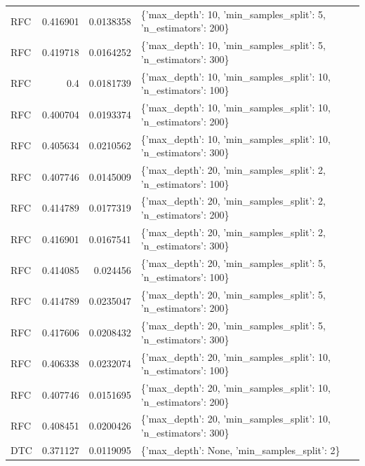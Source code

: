 \documentclass[conference,onecolumn]{IEEEtran}
\begin{document}
\begin{table}
\begin{center}
\begin{longtable}{lrrl}
             RFC          &   0.416901 &       0.0138358  & \{'max\_depth': 10, 'min\_samples\_split': 5, 'n\_estimators': 200\}    \\
             RFC          &   0.419718 &       0.0164252  & \{'max\_depth': 10, 'min\_samples\_split': 5, 'n\_estimators': 300\}    \\
             RFC          &   0.4      &       0.0181739  & \{'max\_depth': 10, 'min\_samples\_split': 10, 'n\_estimators': 100\}   \\
             RFC          &   0.400704 &       0.0193374  & \{'max\_depth': 10, 'min\_samples\_split': 10, 'n\_estimators': 200\}   \\
             RFC          &   0.405634 &       0.0210562  & \{'max\_depth': 10, 'min\_samples\_split': 10, 'n\_estimators': 300\}   \\
             RFC          &   0.407746 &       0.0145009  & \{'max\_depth': 20, 'min\_samples\_split': 2, 'n\_estimators': 100\}    \\
             RFC          &   0.414789 &       0.0177319  & \{'max\_depth': 20, 'min\_samples\_split': 2, 'n\_estimators': 200\}    \\
             RFC          &   0.416901 &       0.0167541  & \{'max\_depth': 20, 'min\_samples\_split': 2, 'n\_estimators': 300\}    \\
             RFC          &   0.414085 &       0.024456   & \{'max\_depth': 20, 'min\_samples\_split': 5, 'n\_estimators': 100\}    \\
             RFC          &   0.414789 &       0.0235047  & \{'max\_depth': 20, 'min\_samples\_split': 5, 'n\_estimators': 200\}    \\
             RFC          &   0.417606 &       0.0208432  & \{'max\_depth': 20, 'min\_samples\_split': 5, 'n\_estimators': 300\}    \\
             RFC          &   0.406338 &       0.0232074  & \{'max\_depth': 20, 'min\_samples\_split': 10, 'n\_estimators': 100\}   \\
             RFC          &   0.407746 &       0.0151695  & \{'max\_depth': 20, 'min\_samples\_split': 10, 'n\_estimators': 200\}   \\
             RFC          &   0.408451 &       0.0200426  & \{'max\_depth': 20, 'min\_samples\_split': 10, 'n\_estimators': 300\}   \\
             DTC          &   0.371127 &       0.0119095  & \{'max\_depth': None, 'min\_samples\_split': 2\}                       \\

\end{longtable}
\end{center}
\end{table}
\end{document}
